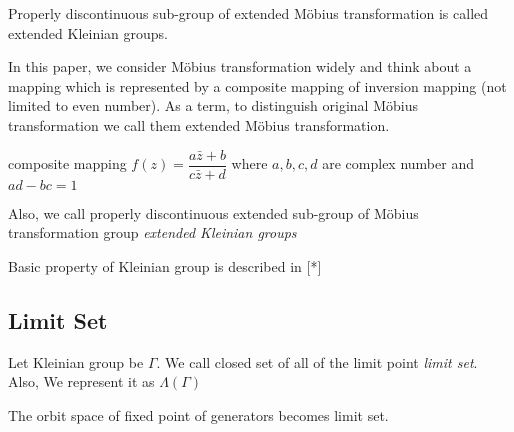 Properly discontinuous sub-group of extended M\"obius transformation
is called extended Kleinian groups.

In this paper, we consider M\"obius transformation widely and
think about a mapping which is represented by a  composite mapping of
inversion mapping (not limited to even number).
As a term, to distinguish original M\"obius transformation
we call them extended M\"obius transformation.

composite mapping $f(z)=\dfrac{a{\bar{z}}+b}{c{\bar{z}}+d}$ where
$a, b, c, d$ are complex number and $ad-bc = 1$


Also, we call properly discontinuous extended sub-group of M\"obius
 transformation group \textit{extended Kleinian groups}

Basic property of Kleinian group is described in [*]

\subsection{Limit Set}

Let Kleinian group be $\Gamma$.
We call closed set of all of the limit point \textit{limit set}.
Also, We represent it as $\Lambda(\Gamma)$

The orbit space of fixed point of generators becomes limit set.